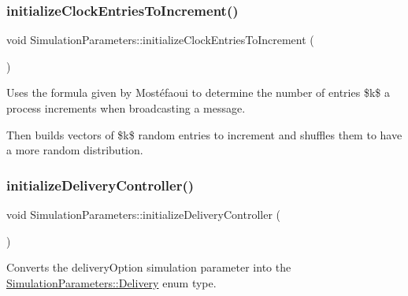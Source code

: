 \mbox{\label{class_simulation_parameters_aeef091d6ca357795fa7ff6b3661fb2fd}} 
\subsubsection{\texorpdfstring{initialize\+Clock\+Entries\+To\+Increment()}{initializeClockEntriesToIncrement()}}
{\footnotesize\ttfamily void Simulation\+Parameters\+::initialize\+Clock\+Entries\+To\+Increment (\begin{DoxyParamCaption}{ }\end{DoxyParamCaption})\hspace{0.3cm}{\ttfamily [protected]}}



Uses the formula given by Mostéfaoui to determine the number of entries \$k\$ a process increments when broadcasting a message. 

Then builds vectors of \$k\$ random entries to increment and shuffles them to have a more random distribution. \mbox{\label{class_simulation_parameters_afec1fdd41805feba54ad575a4542aab1}} 
\subsubsection{\texorpdfstring{initialize\+Delivery\+Controller()}{initializeDeliveryController()}}
{\footnotesize\ttfamily void Simulation\+Parameters\+::initialize\+Delivery\+Controller (\begin{DoxyParamCaption}{ }\end{DoxyParamCaption})\hspace{0.3cm}{\ttfamily [protected]}}



Converts the delivery\+Option simulation parameter into the \hyperlink{class_simulation_parameters_ae08444273809241f502aa422205f7307}{Simulation\+Parameters\+::\+Delivery} enum type. 

